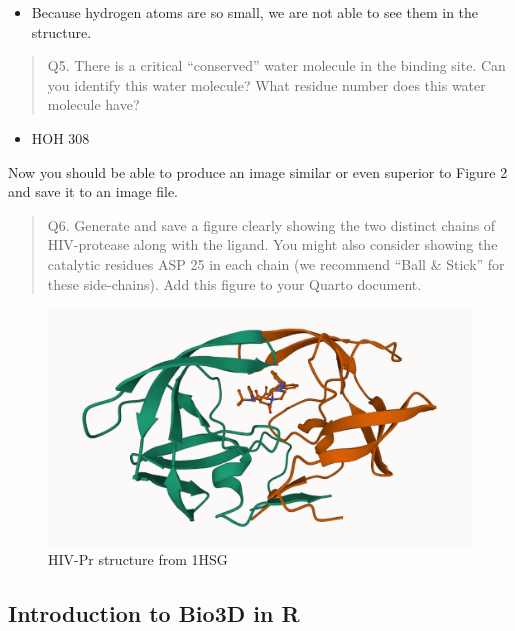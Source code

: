 \documentclass[
  letterpaper,
  DIV=11,
  numbers=noendperiod]{scrartcl}
\providecommand{\tightlist}{%
  \setlength{\itemsep}{0pt}\setlength{\parskip}{0pt}}\usepackage{longtable,booktabs,array}
\begin{document}
\begin{itemize}
\tightlist
\item
  Because hydrogen atoms are so small, we are not able to see them in
  the structure.
\end{itemize}

\begin{quote}
Q5. There is a critical ``conserved'' water molecule in the binding
site. Can you identify this water molecule? What residue number does
this water molecule have?
\end{quote}

\begin{itemize}
\tightlist
\item
  HOH 308
\end{itemize}

Now you should be able to produce an image similar or even superior to
Figure 2 and save it to an image file.

\begin{quote}
Q6. Generate and save a figure clearly showing the two distinct chains
of HIV-protease along with the ligand. You might also consider showing
the catalytic residues ASP 25 in each chain (we recommend ``Ball \&
Stick'' for these side-chains). Add this figure to your Quarto document.
\end{quote}

\begin{figure}

{\centering \includegraphics{1HSG.png}

}

\caption{HIV-Pr structure from 1HSG}

\end{figure}

\hypertarget{introduction-to-bio3d-in-r}{%
\subsection{Introduction to Bio3D in
R}\label{introduction-to-bio3d-in-r}}
\end{document}
